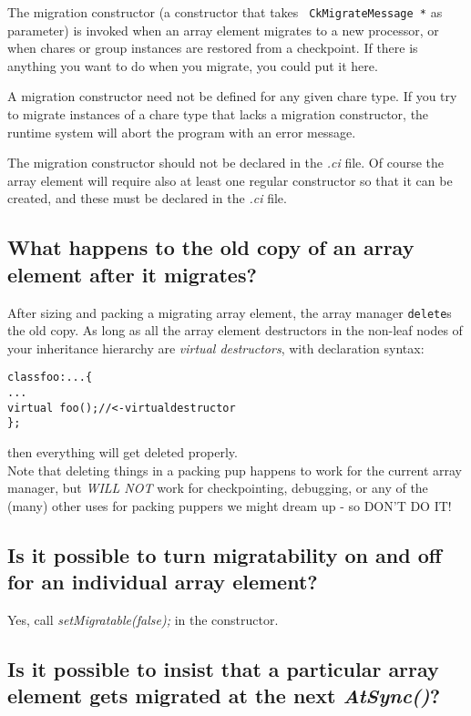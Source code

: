 The migration constructor (a constructor that takes {\tt
  CkMigrateMessage *} as parameter) is invoked when an array element
migrates to a new processor, or when chares or group instances are
restored from a checkpoint. If there is anything you want to do when
you migrate, you could put it here.

A migration constructor need not be defined for any given chare
type. If you try to migrate instances of a chare type that lacks a
migration constructor, the runtime system will abort the program with
an error message.

The migration constructor should not be declared in the {\em .ci} file. Of
course the array element will require also at least one regular constructor so
that it can be created, and these must be declared in the {\em .ci} file.

\subsection{What happens to the old copy of an array element after it migrates?}

After sizing and packing a migrating array element, the array manager
{\tt delete}s
the old copy. As long as all the array element destructors in the non-leaf
nodes of your inheritance hierarchy are {\em virtual destructors}, with
declaration syntax:
\begin{alltt}
class foo : ... \{
  ...
  virtual ~foo(); // <- virtual destructor
\};
\end{alltt}
then everything will get deleted properly.\\
Note that deleting things in a packing pup happens to work for the
current array manager, but {\em WILL NOT} work for checkpointing, debugging,
or any of the (many) other uses for packing puppers we might dream up -
so DON'T DO IT!

\subsection{Is it possible to turn migratability on and off for an individual array
element?}

Yes, call {\em setMigratable(false);} in the constructor.

\subsection{Is it possible to insist that a particular array element gets migrated
at the next {\em AtSync()}?}

